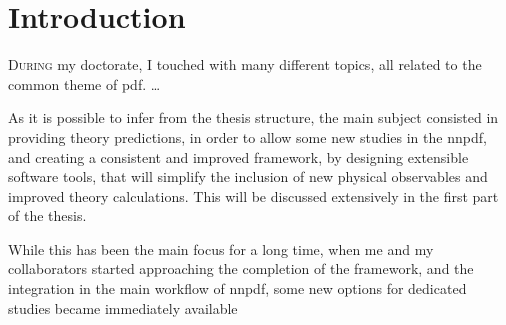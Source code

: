 
\cleardoublepage
{}

\chapter*{Introduction}
%
	{}


\lettrine[lines=3]{\color{BrickRed}D}{uring} my doctorate, I touched with many
different topics, all related to the common theme of \acrfull{pdf}.
\dots

As it is possible to infer from the thesis structure, the main subject
consisted in providing theory predictions, in order to allow some new studies
in the \acrlong{nnpdf}, and creating a consistent and improved framework, by
designing extensible software tools, that will simplify the inclusion of new
physical observables and improved theory calculations.
This will be discussed extensively in the first part of the thesis.

While this has been the main focus for a long time, when me and my
collaborators started approaching the completion of the framework, and the
integration in the main workflow of \acrshort{nnpdf}, some new options for
dedicated studies became immediately available
